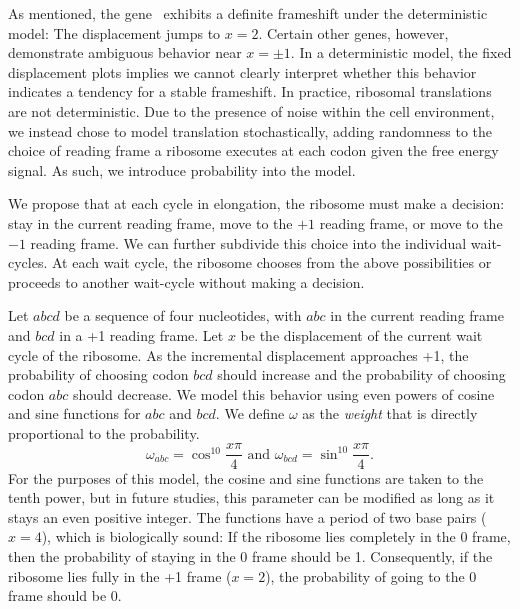 \documentclass[12pt]{article}
\numberwithin{equation}{section}
\begin{document}

As mentioned, the gene \prfB\ exhibits a definite frameshift under the deterministic model: The displacement jumps to $x=2$.
Certain other genes, however, demonstrate ambiguous behavior near $x = \pm 1$.
In a deterministic model, the fixed displacement plots implies
we cannot clearly interpret whether this behavior indicates a tendency for a stable frameshift.
In practice, ribosomal translations are not deterministic. Due to the presence of
noise within the cell environment, we instead chose to model translation stochastically, adding
randomness to the choice of reading frame a ribosome executes at each codon given the free energy signal.
As such, we introduce probability into the model.

We propose that at each cycle in elongation, the ribosome must make a decision: stay in the current reading frame,
move to the $+1$ reading frame,
or move to the $-1$ reading frame.  We can further subdivide this choice into the individual wait-cycles.
At each wait cycle, the ribosome chooses from the above possibilities or proceeds to another wait-cycle without making a decision.

Let $abcd$ be a sequence of four nucleotides, with $abc$ in the
current reading frame and $bcd$ in a +1 reading frame.  Let $x$ be the
displacement of the current wait cycle of the ribosome.  As the
incremental displacement approaches +1, the probability of choosing
codon $bcd$ should increase and the probability of choosing codon
$abc$ should decrease.  We model this behavior using even powers of
cosine and sine functions for $abc$ and $bcd$.  We
define $\omega$ as the \emph{weight} that is directly proportional to
the probability.
\begin{equation}
  \omega_{abc} = \cos^{10}{\frac{x\pi}{4}} \text{ and } \omega_{bcd} = \sin^{10}{\frac{x\pi}{4}}.
\end{equation}
For the purposes of this model, the cosine and sine functions are taken to the tenth power, but
in future studies, this parameter can be modified as long as it stays an even positive integer.
The functions have a period of two base pairs ($x=4$), which is biologically sound:
If the ribosome lies completely in the 0 frame, then the probability of staying in the 0 frame should be 1.  
Consequently, if the ribosome lies fully in the +1 frame ($x=2$), the probability of going to
the 0 frame should be 0.

\end{document}
